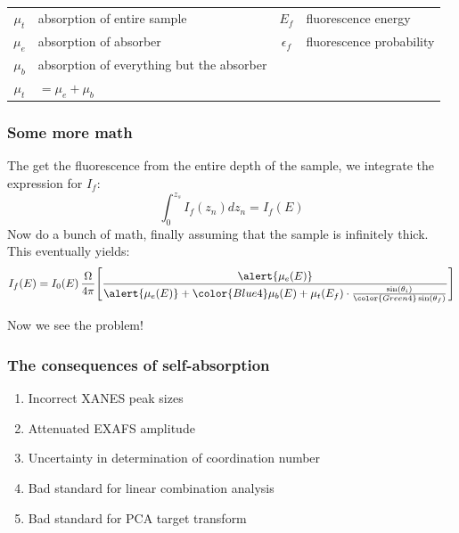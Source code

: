 \documentclass[10pt, xcolor=x11names, compress]{beamer}
\begin{document}
\begin{frame}
  \begin{tabular}{clcl}
    $\mu_t$ & absorption of entire sample &  $E_f$ & fluorescence energy \\
    $\mu_e$ & absorption of absorber &  $\epsilon_f$ & fluorescence probability \\
    $\mu_b$ & absorption of everything but the absorber &   & \\
    $\mu_t$ & $=\mu_e+\mu_b$ &   & \\
  \end{tabular}
\end{frame}

\begin{frame}
  \frametitle{Some more math}
  The get the fluorescence from the entire depth of the sample, we
  integrate the expression for $I_f$:
  \begin{equation}
    \label{eq:integ}
    \int_0^{z_s} I_f(z_n) dz_n = I_f(E)
  \end{equation}
  Now do a bunch of math, finally assuming that the sample is
  infinitely thick.  This eventually yields:
  \begin{equation}
    \label{eq:result}
    I_f(E) = I_0(E)\,\frac{\Omega}{4\pi}
    \Bigg[
    \frac{\alert{\mu_e(E)}}
    {\alert{\mu_e(E)}+{\color{Blue4}\mu_b(E)}+\mu_t(E_f)
      \cdot\frac{\sin(\theta_i)}{\color{Green4}\sin(\theta_f)}}
    \Bigg]
  \end{equation}
  \begin{center}
    Now we see \alert{the problem}!
  \end{center}
\end{frame}

\begin{frame}
  \frametitle{The consequences of self-absorption}
  \begin{enumerate}
  \item Incorrect XANES peak sizes
  \item Attenuated EXAFS amplitude
  \item Uncertainty in determination of coordination number
  \item Bad standard for linear combination analysis
  \item Bad standard for PCA target transform
  \end{enumerate}
\end{frame}
\end{document}
